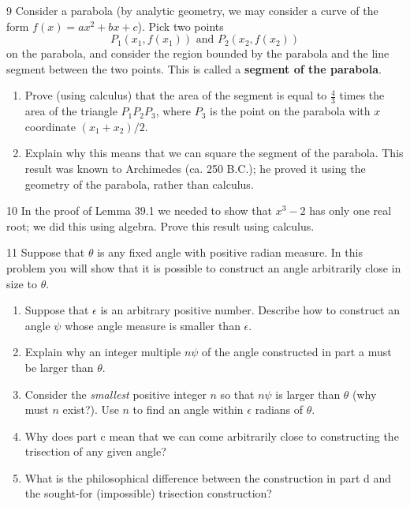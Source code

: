 \begin{problem}{9}
    Consider a parabola (by analytic geometry, we may consider a curve of the form
    $f(x) = ax^2 + bx + c$). Pick two points
    \[P_1(x_1, f(x_1)) \text{ and } P_2(x_2, f(x_2))\]
    on the parabola, and consider the region bounded by the parabola and the line segment
    between the two points. This is called a \textbf{segment of the parabola}.
    \begin{enumerate}
        \item[(a)] Prove (using calculus) that the area of the segment is equal to
        $\frac{4}{3}$ times the area of the triangle $P_1P_2P_3$, where $P_3$ is the point
        on the parabola with $x$ coordinate $(x_1 + x_2)/2$.
        \item[(b)] Explain why this means that we can square the segment of the parabola.
        This result was known to Archimedes (ca. 250 B.C.); he proved it using the geometry
        of the parabola, rather than calculus.
    \end{enumerate}
\end{problem}
\unsolved

\begin{problem}{10}
    In the proof of Lemma 39.1 we needed to show that $x^3 - 2$ has only one real root; we
    did this using algebra. Prove this result using calculus.
\end{problem}
\unsolved

\begin{problem}{11}
    Suppose that $\theta$ is any fixed angle with positive radian measure. In this problem
    you will show that it is possible to construct an angle arbitrarily close in size to
    $\theta$.
    \begin{enumerate}
        \item[(a)] Suppose that $\epsilon$ is an arbitrary positive number. Describe how to
        construct an angle $\psi$ whose angle measure is smaller than $\epsilon$.
        \item[(b)] Explain why an integer multiple $n\psi$ of the angle constructed in part
        a must be larger than $\theta$.
        \item[(c)] Consider the \emph{smallest} positive integer $n$ so that $n\psi$ is
        larger than $\theta$ (why must $n$ exist?). Use $n$ to find an angle within
        $\epsilon$ radians of $\theta$.
        \item[(d)] Why does part c mean that we can come arbitrarily close to constructing
        the trisection of any given angle?
        \item[(e)] What is the philosophical difference between the construction in part d
        and the sought-for (impossible) trisection construction?
    \end{enumerate}
\end{problem}
\unsolved
